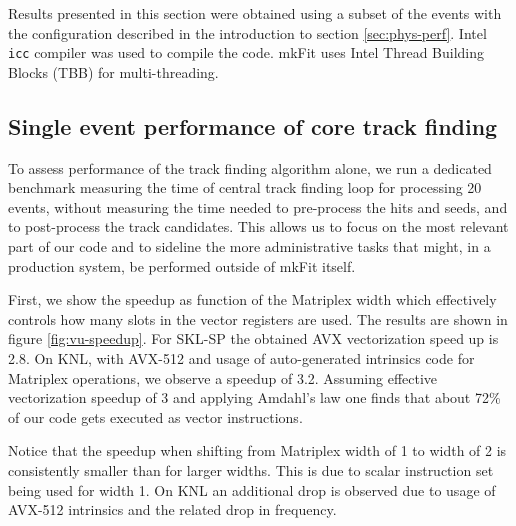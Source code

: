 \documentclass{webofc}
\def\mkfit{mkFit\xspace}
\def\stt#1{{\small\texttt{#1}}}
\begin{document}
Results presented in this section were obtained using a subset of the 
events with the configuration described in the introduction to section 
\ref{sec:phys-perf}. Intel \stt{icc} compiler was used to compile the
code. \mkfit uses Intel Thread Building Blocks (TBB) for multi-threading.


\subsection{Single event performance of core track finding}

To assess performance of the track finding algorithm alone, we run a dedicated
benchmark measuring the time of central track finding loop for processing 20 
events, without measuring the time needed to pre-process the hits and seeds, 
and to post-process the track candidates. This allows us to focus on the most 
relevant part of our code and to sideline the more administrative tasks that 
might, in a production system, be performed outside of \mkfit itself.

First, we show the speedup as function of the Matriplex width which
effectively controls how many slots in the vector registers are used. The
results are shown in figure \ref{fig:vu-speedup}.
For SKL-SP the obtained AVX vectorization speed up is 2.8. On KNL, with AVX-512
and usage of auto-generated intrinsics code for Matriplex operations, we
observe a speedup of 3.2. Assuming effective
vectorization speedup of 3 and applying Amdahl's law one finds that about 72\%
of our code gets executed as vector instructions.

Notice that the speedup when shifting from Matriplex width of 1 to width of 2
is consistently smaller than for larger widths.
This is due to scalar instruction set being used for width 1. On KNL
an additional drop is observed due to usage of AVX-512 intrinsics and the
related drop in frequency.
\end{document}
